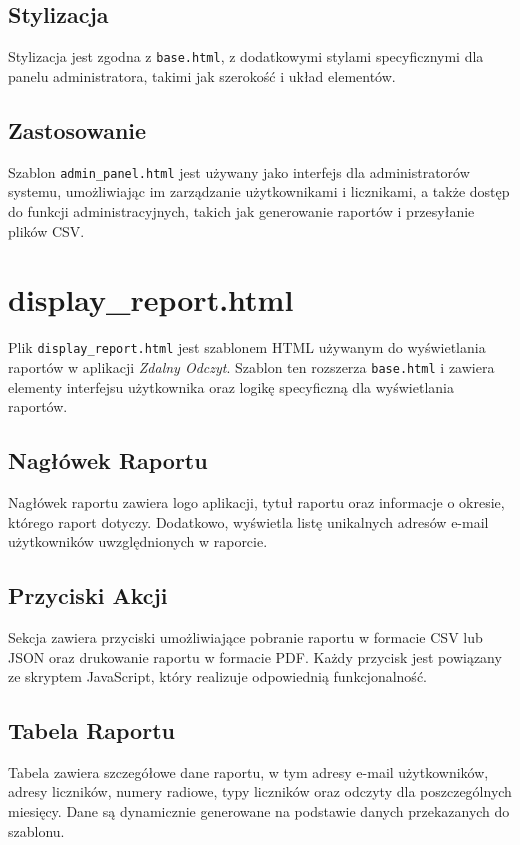 \documentclass[12pt,a4paper]{report}
\begin{document}
\subsection{Stylizacja}
Stylizacja jest zgodna z \texttt{base.html}, z dodatkowymi stylami specyficznymi dla panelu administratora, takimi jak szerokość i układ elementów.

\subsection{Zastosowanie}
Szablon \texttt{admin\_panel.html} jest używany jako interfejs dla administratorów systemu, umożliwiając im zarządzanie użytkownikami i licznikami, a także dostęp do funkcji administracyjnych, takich jak generowanie raportów i przesyłanie plików CSV.

\section{display\_report.html}
\label{sec:displayreport}
Plik \texttt{display\_report.html} jest szablonem HTML używanym do wyświetlania raportów w aplikacji \textit{Zdalny Odczyt}. Szablon ten rozszerza \texttt{base.html} i zawiera elementy interfejsu użytkownika oraz logikę specyficzną dla wyświetlania raportów.

\subsection{Nagłówek Raportu}
Nagłówek raportu zawiera logo aplikacji, tytuł raportu oraz informacje o okresie, którego raport dotyczy. Dodatkowo, wyświetla listę unikalnych adresów e-mail użytkowników uwzględnionych w raporcie.

\subsection{Przyciski Akcji}
Sekcja zawiera przyciski umożliwiające pobranie raportu w formacie CSV lub JSON oraz drukowanie raportu w formacie PDF. Każdy przycisk jest powiązany ze skryptem JavaScript, który realizuje odpowiednią funkcjonalność.

\subsection{Tabela Raportu}
Tabela zawiera szczegółowe dane raportu, w tym adresy e-mail użytkowników, adresy liczników, numery radiowe, typy liczników oraz odczyty dla poszczególnych miesięcy. Dane są dynamicznie generowane na podstawie danych przekazanych do szablonu.
\end{document}
